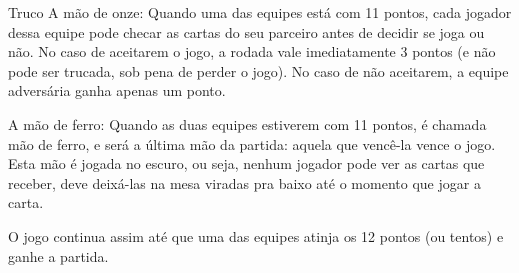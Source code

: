 \begin{subsecao}{Truco}
A mão de onze: Quando uma das equipes está com 11 pontos, cada jogador dessa
equipe pode checar as cartas do seu parceiro antes de decidir se joga ou não.
No caso de aceitarem o jogo, a rodada vale imediatamente 3 pontos (e não pode
ser trucada, sob pena de perder o jogo). No caso de não aceitarem, a equipe
adversária ganha apenas um ponto. 

A mão de ferro: Quando as duas equipes estiverem com 11 pontos, é chamada
mão de ferro, e será a última mão da partida: aquela que vencê-la
vence o jogo. Esta mão é jogada no escuro, ou seja, nenhum jogador
pode ver as cartas que receber, deve deixá-las na mesa viradas
pra baixo até o momento que jogar a carta. 

O jogo continua assim até que uma das equipes atinja os 12 pontos (ou tentos) e
ganhe a partida.

\end{subsecao}
